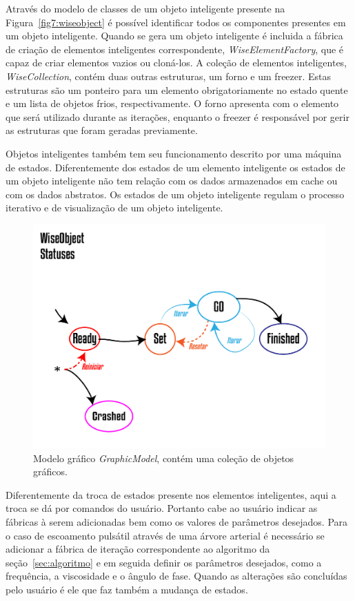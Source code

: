 \documentclass[
        english,			
        brazil			        %
        ,<...>]{abntbibufjf}
\begin{document}
Através do modelo de classes de um objeto inteligente presente na Figura~\ref{fig7:wiseobject} é possível identificar todos os componentes presentes em um objeto inteligente. Quando se gera um objeto inteligente é incluida a fábrica de criação de elementos inteligentes correspondente, \textit{WiseElementFactory}, que é capaz de criar elementos vazios ou cloná-los. A coleção de elementos inteligentes, \textit{WiseCollection}, contém duas outras estruturas, um forno e um freezer. Estas estruturas são um ponteiro para um elemento obrigatoriamente no estado quente e um lista de objetos frios, respectivamente. O forno apresenta com o elemento que será utilizado durante as iterações, enquanto o freezer é responsável por gerir as estruturas que foram geradas previamente.

Objetos inteligentes também tem seu funcionamento descrito por uma máquina de estados. Diferentemente dos estados de um elemento inteligente os estados de um objeto inteligente não tem relação com os dados armazenados em cache ou com os dados abstratos. Os estados de um objeto inteligente regulam o processo iterativo e de visualização de um objeto inteligente.

\begin{figure}[!htbp]
	\centering
	\includegraphics[scale=1]{Figures/WiseObjectStatus.png}
	\caption{Modelo gráfico \textit{GraphicModel}, contém uma coleção de objetos gráficos.}
	\label{fig7:wiseobjectstatuses}
\end{figure}

Diferentemente da troca de estados presente nos elementos inteligentes, aqui a troca se dá por comandos do usuário. Portanto cabe ao usuário indicar as fábricas à serem adicionadas bem como os valores de parâmetros desejados. Para o caso de escoamento pulsátil através de uma árvore arterial é necessário se adicionar a fábrica de iteração correspondente ao algoritmo da seção~\ref{sec:algoritmo} e em seguida definir os parâmetros desejados, como a frequência, a viscosidade e o ângulo de fase. Quando as alterações são concluídas pelo usuário é ele que faz também a mudança de estados.
\end{document}
